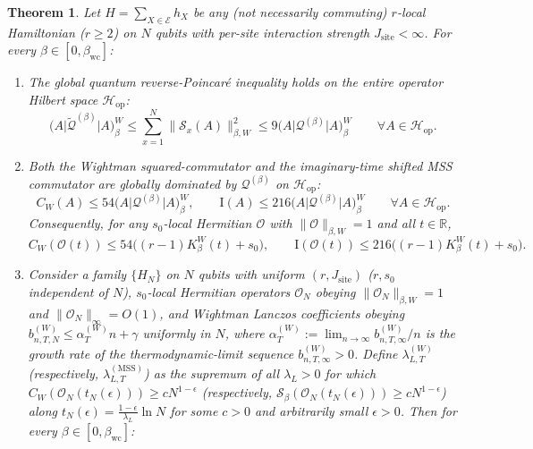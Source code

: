\documentclass[11pt,a4paper]{article}
\numberwithin{equation}{section}
\theoremstyle{plain}
\newtheorem{theorem}{Theorem}[section]
\theoremstyle{definition}
\newcommand{\Hop}{\mathcal{H}_{\mathrm{op}}}
\newcommand{\MSS}{\mathrm{MSS}}
\begin{document}
\begin{theorem}\label{thm:main-highT}
Let $H = \sum_{X\in\mathcal{E}} h_X$ be any (not necessarily commuting) $r$-local Hamiltonian ($r\ge 2$) on $N$ qubits with per-site interaction strength $J_{\mathrm{site}} < \infty$. For every $\beta\in[0,\beta_{\mathrm{wc}}]$:
\begin{enumerate}
  \setlength{\itemsep}{3pt}\setlength{\parskip}{0pt}
  \item[\emph{(a)}] The global quantum reverse-Poincar\'e inequality holds on the entire operator Hilbert space $\Hop$:
  \begin{equation}\label{eq:main-rp}
    \bigl(A\big|\widetilde{\mathcal{Q}}^{(\beta)}\big|A\bigr)_\beta^W \le \sum_{x=1}^N \|\mathcal{S}_x(A)\|_{\beta,W}^2 \le 9\bigl(A\big|\mathcal{Q}^{(\beta)}\big|A\bigr)_\beta^W \qquad \forall A\in\Hop.
  \end{equation}
  \item[\emph{(b)}] Both the Wightman squared-commutator and the imaginary-time shifted MSS commutator are globally dominated by $\mathcal{Q}^{(\beta)}$ on $\Hop$:
  \begin{equation}\label{eq:main-CW-I}
    C_W(A) \le 54\bigl(A\big|\mathcal{Q}^{(\beta)}\big|A\bigr)_\beta^W, \qquad \mathrm{I}(A) \le 216\bigl(A\big|\mathcal{Q}^{(\beta)}\big|A\bigr)_\beta^W \qquad \forall A\in\Hop.
  \end{equation}
  Consequently, for any $s_0$-local Hermitian $\mathcal{O}$ with $\|\mathcal{O}\|_{\beta,W}=1$ and all $t\in\mathbb{R}$,
  \begin{equation}\label{eq:main-dyn-bounds}
    C_W(\mathcal{O}(t)) \le 54\bigl((r-1)K_\beta^W(t) + s_0\bigr), \qquad \mathrm{I}(\mathcal{O}(t)) \le 216\bigl((r-1)K_\beta^W(t) + s_0\bigr).
  \end{equation}
  \item[\emph{(c)}] Consider a family $\{H_N\}$ on $N$ qubits with uniform $(r,J_{\mathrm{site}})$ ($r, s_0$ independent of $N$), $s_0$-local Hermitian operators $\mathcal{O}_N$ obeying $\|\mathcal{O}_N\|_{\beta,W}=1$ and $\|\mathcal{O}_N\|_\infty = O(1)$, and Wightman Lanczos coefficients obeying $b_{n,T,N}^{(W)} \le \alpha_T^{(W)} n + \gamma$ uniformly in $N$, where $\alpha_T^{(W)} := \lim_{n\to\infty} b_{n,T,\infty}^{(W)}/n$ is the growth rate of the thermodynamic-limit sequence $b_{n,T,\infty}^{(W)} > 0$. Define $\lambda_{L,T}^{(W)}$ (respectively, $\lambda_{L,T}^{(\MSS)}$) as the supremum of all $\lambda_L > 0$ for which $C_W(\mathcal{O}_N(t_N(\epsilon))) \ge c N^{1-\epsilon}$ (respectively, $\mathcal{S}_\beta(\mathcal{O}_N(t_N(\epsilon))) \ge c N^{1-\epsilon}$) along $t_N(\epsilon) = \frac{1-\epsilon}{\lambda_L}\ln N$ for some $c>0$ and arbitrarily small $\epsilon > 0$. Then for every $\beta\in[0,\beta_{\mathrm{wc}}]$:

\end{enumerate}
\end{theorem}
\end{document}

